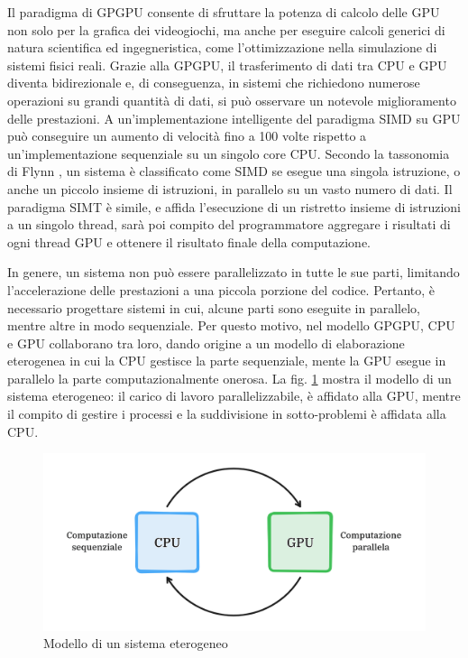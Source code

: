 Il paradigma di \gls{GPGPU} consente di sfruttare la potenza di calcolo delle \gls{GPU} non solo per la grafica dei videogiochi, ma anche per eseguire calcoli generici di natura scientifica ed ingegneristica, come l'ottimizzazione nella simulazione di sistemi fisici reali. Grazie alla \gls{GPGPU}, il trasferimento di dati tra \gls{CPU} e \gls{GPU} diventa bidirezionale e, di conseguenza, in sistemi che richiedono numerose operazioni su grandi quantità di dati, si può osservare un notevole miglioramento delle prestazioni. A un'implementazione intelligente del paradigma \gls{SIMD} su \gls{GPU} può conseguire un aumento di velocità fino a 100 volte rispetto a un'implementazione sequenziale su un singolo core \gls{CPU}. Secondo la tassonomia di Flynn \cite[]{Flynn:tax}, un sistema è classificato come \gls{SIMD} se esegue una singola istruzione, o anche un piccolo insieme di istruzioni, in parallelo su un vasto numero di dati. Il paradigma \gls{SIMT} è simile, e affida l'esecuzione di un ristretto insieme di istruzioni a un singolo thread, sarà poi compito del programmatore aggregare i risultati di ogni thread \gls{GPU} e ottenere il risultato finale della computazione.

In genere, un sistema non può essere parallelizzato in tutte le sue parti, limitando l'accelerazione delle prestazioni a una piccola porzione del codice. Pertanto, è necessario progettare sistemi in cui, alcune parti sono eseguite in parallelo, mentre altre in modo sequenziale. Per questo motivo, nel modello \gls{GPGPU}, \gls{CPU} e \gls{GPU} collaborano tra loro, dando origine a un modello di elaborazione eterogenea in cui la \gls{CPU} gestisce la parte sequenziale, mente la \gls{GPU} esegue in parallelo la parte computazionalmente onerosa.
La fig. \ref{fig:het_model} mostra il modello di un sistema eterogeneo: il carico di lavoro parallelizzabile, è affidato alla \gls{GPU}, mentre il compito di gestire i processi e la suddivisione in sotto-problemi è affidata alla \gls{CPU}.

\begin{figure}[ht]
    \centering
    \includegraphics[width=.9\linewidth]{images/chapter2/het_model2.png}
    \caption{Modello di un sistema eterogeneo}
    \label{fig:het_model}
\end{figure}

